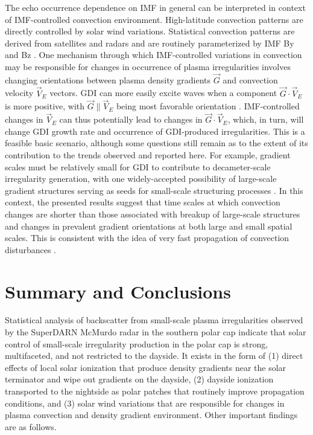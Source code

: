 The echo occurrence dependence on IMF in general can be interpreted in context of IMF-controlled convection environment. High-latitude convection patterns are directly controlled by solar wind variations. Statistical convection patterns are derived from satellites and radars and are routinely parameterized by IMF By and Bz \citep{Haaland2007, Pettigrew2010}. One mechanism through which IMF-controlled variations in convection may be responsible for changes in occurrence of plasma irregularities involves changing orientations between plasma density gradients \(\vec{G}\) and convection velocity \(\vec{V}_E\) vectors. GDI can more easily excite waves when a component \(\vec{G}\cdot\vec{V}_E\) is more positive, with \(\vec{G}\parallel\vec{V}_E\) being most favorable orientation \citep{Kesknein1982a,Makarevich2014c}. IMF-controlled changes in \(\vec{V}_E\) can thus potentially lead to changes in \(\vec{G}\cdot\vec{V}_E\), which, in turn, will change GDI growth rate and occurrence of GDI-produced irregularities. This is a feasible basic scenario, although some questions still remain as to the extent of its contribution to the trends observed and reported here. For example, gradient scales must be relatively small for GDI to contribute to decameter-scale irregularity generation, with one widely-accepted possibility of large-scale gradient structures serving as seeds for small-scale structuring processes \citep{Tsunoda1988}. In this context, the presented results suggest that time scales at which convection changes are shorter than those associated with breakup of large-scale structures and changes in prevalent gradient orientations at both large and small spatial scales. This is consistent with the idea of very fast propagation of convection disturbances \citep{Ridley1998,Ruohoniemi2002,Fiori2012,Taguchi2015}.


\section{Summary and Conclusions}

Statistical analysis of backscatter from small-scale plasma irregularities observed by the SuperDARN McMurdo radar in the southern polar cap indicate that solar control of small-scale irregularity production in the polar cap is strong, multifaceted, and not restricted to the dayside. It exists in the form of (1) direct effects of local solar ionization that produce density gradients near the solar terminator and wipe out gradients on the dayside, (2) dayside ionization transported to the nightside as polar patches that routinely improve propagation conditions, and (3) solar wind variations that are responsible for changes in plasma convection and density gradient environment. Other important findings are as follows.

